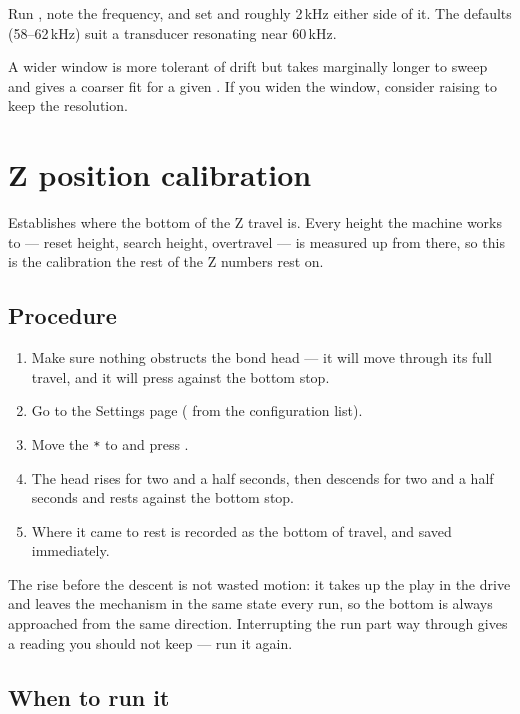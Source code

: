 Run , note the frequency, and set  and
 roughly 2\,kHz either side of it. The defaults
(58--62\,kHz) suit a transducer resonating near 60\,kHz.

A wider window is more tolerant of drift but takes marginally longer to sweep
and gives a coarser fit for a given . If you widen the
window, consider raising  to keep the resolution.

\section{Z position calibration}
\label{sec:z-position-cal}

Establishes where the bottom of the Z travel is. Every height the machine works
to --- reset height, search height, overtravel --- is measured up from there, so
this is the calibration the rest of the Z numbers rest on.

\subsection*{Procedure}

\begin{enumerate}[leftmargin=*]
\item Make sure nothing obstructs the bond head --- it will move through its
  full travel, and it will press against the bottom stop.
\item Go to the Settings page ( from the configuration list).
\item Move the \texttt{*} to  and press
  .
\item The head rises for two and a half seconds, then descends for two and a
  half seconds and rests against the bottom stop.
\item Where it came to rest is recorded as the bottom of travel, and saved
  immediately.
\end{enumerate}

\begin{wbnote}
The rise before the descent is not wasted motion: it takes up the play in the
drive and leaves the mechanism in the same state every run, so the bottom is
always approached from the same direction. Interrupting the run part way
through gives a reading you should not keep --- run it again.
\end{wbnote}

\subsection*{When to run it}


